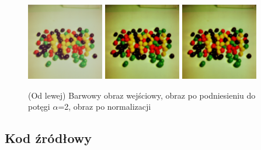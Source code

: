 \documentclass[final,a4paper,openany,12pt]{mwbk}
\begin{document}
\begin{figure}[H]
	\begin{center}
		\includegraphics[width=0.3\textwidth]{2/2Color_Pow_Original}
		\includegraphics[width=0.3\textwidth]{2/2Color_Pow_Result}
		\includegraphics[width=0.3\textwidth]{2/2Color_Pow_Result_Norm}
	\end{center}
	\caption{(Od lewej) Barwowy obraz wejściowy, obraz po podniesieniu do potęgi $\alpha$=2, obraz po normalizacji }
\end{figure}

\subsection*{Kod źródłowy}
\end{document}
